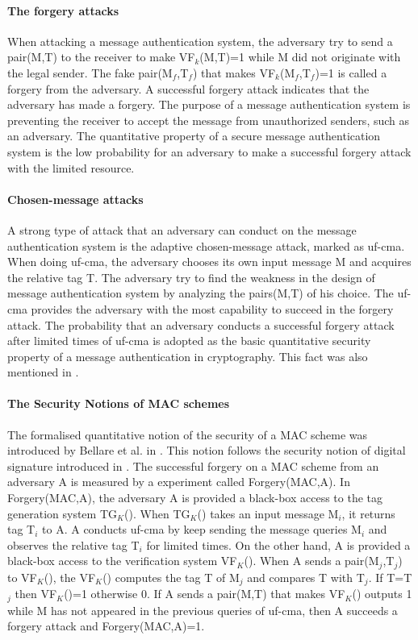 \documentclass{article}
\begin{document}
\paragraph{The forgery attacks}
When attacking a message authentication system, the adversary try to send a pair(M,T) to the receiver to make VF$_k$(M,T)=1 while M did not originate with the legal sender. The fake pair(M$_f$,T$_f$) that makes VF$_k$(M$_f$,T$_f$)=1 is called a forgery from the adversary. A successful forgery attack indicates that the adversary has made a forgery. 
The purpose of a message authentication system is preventing the receiver to accept the message from unauthorized senders, such as an adversary. The quantitative property of a secure message authentication system is the low probability for an adversary to make a successful forgery attack with the limited resource.
\paragraph{Chosen-message attacks}
A strong type of attack that an adversary can conduct on the message authentication system is the adaptive chosen-message attack, marked as uf-cma. When doing uf-cma, the adversary chooses its own input message M and acquires the relative tag T. The adversary try to find the weakness in the design of message authentication system by analyzing the pairs(M,T) of his choice. The uf-cma provides the adversary with the most capability to succeed in the forgery attack. The probability that an adversary conducts a successful forgery attack after limited times of uf-cma is adopted as the basic quantitative security property of a message authentication in cryptography. This fact was also mentioned in \cite{Rogaway2011}.
\paragraph{The Security Notions of MAC schemes}
The formalised quantitative notion of the security of a MAC scheme was introduced by Bellare et al. in \cite{cbc1994}. This notion follows the security notion of digital signature introduced in \cite{signature}. The successful forgery on a MAC scheme from an adversary A is measured by a experiment called Forgery(MAC,A). In Forgery(MAC,A),  
the adversary A is provided a black-box access to the tag generation system TG$_K$(). When TG$_K$() takes an input message M$_i$, it returns tag T$_i$ to A. A conducts uf-cma by keep sending the message queries M$_i$ and observes the relative tag T$_i$ for limited times. On the other hand, A is provided a black-box access to the verification system VF$_K$(). When A sends a pair(M$_j$,T$_j$) to VF$_K$(), the VF$_K$() computes the tag T of M$_j$ and compares T with T$_j$. If T=T$_j$ then VF$_K$()=1 otherwise 0. If A sends a pair(M,T) that makes VF$_K$() outputs 1 while M has not appeared in the previous queries of uf-cma, then A succeeds a forgery attack and Forgery(MAC,A)=1.
\end{document}
